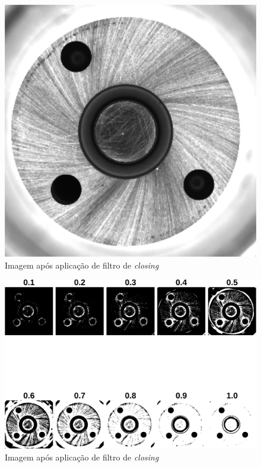\documentclass[conference]{IEEEtran}
\begin{document}
\begin{figure}[h]
	\centering
	\includegraphics[scale=0.18]{Images/Image0000_closed.png}
	\caption{Imagem após aplicação de filtro de \textit{closing}}
	\label{fig:imClosed}
\end{figure}

\begin{figure}[h]
	\centering
	\includegraphics[scale=0.65]{Images/Image0000_sensitivity.png}
	\caption{Imagem após aplicação de filtro de \textit{closing}}
	\label{fig:sensivities}
\end{figure}
\end{document}
